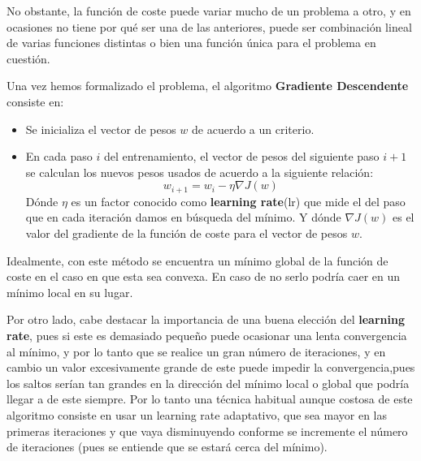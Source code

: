            \medskip

            \noindent No obstante, la función de coste puede variar mucho de un problema a otro, y en ocasiones no tiene por qué ser una de las anteriores, puede ser combinación lineal de varias funciones distintas o bien una función única para el problema en cuestión.

            \medskip

            \noindent Una vez hemos formalizado el problema, el algoritmo \textbf{Gradiente Descendente} consiste en: 
    
            \begin{itemize}
                \item Se inicializa el vector de pesos $w$ de acuerdo a un criterio.
                \item En cada paso $i$ del entrenamiento, el vector de pesos del siguiente paso $i+1$ se calculan los nuevos pesos usados de acuerdo a la siguiente relación: 
                \begin{equation}
                    w_{i+1}=w_i-\eta \nabla J(w)
                \end{equation}
                \noindent Dónde $\eta$ es un factor conocido como \textbf{learning rate}(lr) que mide el  del paso que en cada iteración damos en búsqueda del mínimo. Y dónde $\nabla J(w)$ es el valor del gradiente de la función de coste para el vector de pesos $w$. 
            \end{itemize}
    
            \noindent Idealmente, con este método se encuentra un mínimo global de la función de coste en el caso en que esta sea convexa. En caso de no serlo podría caer en un mínimo local en su lugar. 
    
            \medskip
    
            \noindent Por otro lado, cabe destacar la importancia de una buena elección del \textbf{learning rate}, pues si este es demasiado pequeño puede ocasionar una lenta convergencia al mínimo, y por lo tanto que se realice un gran número de iteraciones, y en cambio un valor excesivamente grande de este puede impedir la convergencia,pues los saltos serían tan grandes en la dirección del mínimo local o global que podría llegar a  de este siempre. Por lo tanto una técnica habitual aunque costosa de este algoritmo consiste en usar un learning rate adaptativo, que sea mayor en las primeras iteraciones y que vaya disminuyendo conforme se incremente el número de iteraciones (pues se entiende que se estará cerca del mínimo).
    
